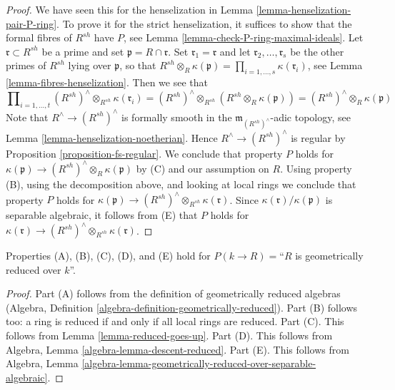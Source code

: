 \begin{proof}
We have seen this for the henselization in
Lemma \ref{lemma-henselization-pair-P-ring}.
To prove it for the strict henselization, it suffices to
show that the formal fibres of $R^{sh}$ have $P$, see
Lemma \ref{lemma-check-P-ring-maximal-ideals}.
Let $\mathfrak r \subset R^{sh}$ be a prime and set
$\mathfrak p = R \cap \mathfrak r$. Set $\mathfrak r_1 = \mathfrak r$
and let $\mathfrak r_2, \ldots, \mathfrak r_s$
be the other primes of $R^{sh}$ lying over $\mathfrak p$, so that
$R^{sh} \otimes_R \kappa(\mathfrak p) =
\prod\nolimits_{i = 1, \ldots, s} \kappa(\mathfrak r_i)$, see
Lemma \ref{lemma-fibres-henselization}.
Then we see that
$$
\prod\nolimits_{i = 1, \ldots, t}
(R^{sh})^\wedge \otimes_{R^{sh}} \kappa(\mathfrak r_i) =
(R^{sh})^\wedge \otimes_{R^{sh}} (R^{sh} \otimes_R \kappa(\mathfrak p)) =
(R^{sh})^\wedge \otimes_R \kappa(\mathfrak p)
$$
Note that $R^\wedge \to (R^{sh})^\wedge$ is formally smooth
in the $\mathfrak m_{(R^{sh})^\wedge}$-adic topology, see
Lemma \ref{lemma-henselization-noetherian}.
Hence $R^\wedge \to (R^{sh})^\wedge$ is regular by
Proposition \ref{proposition-fs-regular}.
We conclude that property $P$ holds for
$\kappa(\mathfrak p) \to (R^{sh})^\wedge \otimes_R \kappa(\mathfrak p)$
by (C) and our assumption on $R$. Using property (B), using the
decomposition above, and looking
at local rings we conclude that property $P$ holds for
$\kappa(\mathfrak p) \to (R^{sh})^\wedge \otimes_{R^{sh}} \kappa(\mathfrak r)$.
Since $\kappa(\mathfrak r)/\kappa(\mathfrak p)$ is separable algebraic,
it follows from (E) that $P$ holds for
$\kappa(\mathfrak r) \to (R^{sh})^\wedge \otimes_{R^{sh}} \kappa(\mathfrak r)$.
\end{proof}

\begin{lemma}
\label{lemma-formal-fibres-reduced}
Properties (A), (B), (C), (D), and (E) hold for
$P(k \to R) =$``$R$ is geometrically reduced over $k$''.
\end{lemma}

\begin{proof}
Part (A) follows from the definition of geometrically reduced
algebras (Algebra, Definition \ref{algebra-definition-geometrically-reduced}).
Part (B) follows too: a ring is reduced if and only if
all local rings are reduced.
Part (C). This follows from Lemma \ref{lemma-reduced-goes-up}.
Part (D). This follows from Algebra, Lemma \ref{algebra-lemma-descent-reduced}.
Part (E). This follows from Algebra, Lemma
\ref{algebra-lemma-geometrically-reduced-over-separable-algebraic}.
\end{proof}

